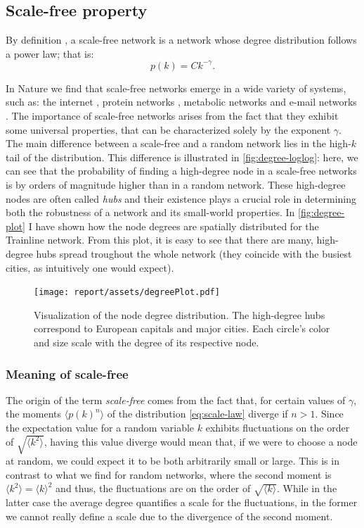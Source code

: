\subsection{Scale-free property}
\label{subsec:scale-free}
By definition \cite{barabasi}, a scale-free network is a network whose degree distribution follows a power law; that is:
\begin{equation}
    p(k) = C k^{-\gamma}.
    \label{eq:scale-law}
\end{equation}

In Nature we find that scale-free networks emerge in a wide variety of systems, such as: the internet \cite{barabasi99}, protein networks \cite{barabasi21}, metabolic networks \cite{barabasi20} and e-mail networks \cite{barabasi113}. The importance of scale-free networks arises from the fact that they exhibit some universal properties, that can be characterized solely by the exponent $\gamma$.
The main difference between a scale-free and a random network lies in the high-$k$ tail of the distribution. This difference is illustrated in \autoref{fig:degree-loglog}: here, we can see that the probability of finding a high-degree node in a scale-free networks is by orders of magnitude higher than in a random network. These high-degree nodes are often called \emph{hubs} and their existence plays a crucial role in determining both the robustness of a network and its small-world properties.
In \autoref{fig:degree-plot} I have shown how the node degrees are spatially distributed for the Trainline network. From this plot, it is easy to see that there are many, high-degree hubs spread troughout the whole network (they coincide with the busiest cities, as intuitively one would expect).

\begin{figure}[h]
    \centering
    \texttt{[image: report/assets/degreePlot.pdf]}
    \caption{
    Visualization of the node degree distribution. The high-degree hubs correspond to European capitals and major cities. Each circle's color and size scale with the degree of its respective node.
}
    \label{fig:degree-plot}
\end{figure}

\subsubsection{Meaning of scale-free}
The origin of the term \emph{scale-free} comes from the fact that, for certain values of $\gamma$, the moments $\langle p(k)^n \rangle$ of the distribution \eqref{eq:scale-law} diverge if $n > 1$. Since the expectation value for a random variable $k$ exhibits fluctuations on the order of $\sqrt{\langle k^2 \rangle}$, having this value diverge would mean that, if we were to choose a node at random, we could expect it to be both arbitrarily small or large. This is in contrast to what we find for random networks, where the second moment is $\langle k^2 \rangle = \langle k \rangle^2$ and thus, the fluctuations are on the order of $\sqrt{\langle k \rangle}$. While in the latter case the average degree quantifies a scale for the fluctuations, in the former we cannot really define a scale due to the divergence of the second moment.

